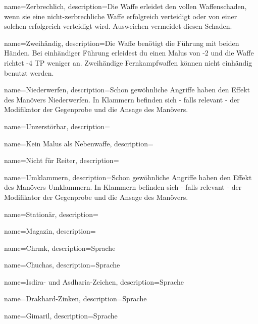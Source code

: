 {
    name={Zerbrechlich},
    description={Die Waffe erleidet den vollen Waffenschaden, wenn sie eine nicht-zerbrechliche Waffe erfolgreich verteidigt oder von einer solchen erfolgreich verteidigt wird. Ausweichen vermeidet diesen Schaden.}
}


{
    name={Zweihändig},
    description={Die Waffe benötigt die Führung mit beiden Händen. Bei einhändiger Führung erleidest du einen Malus von -2 und die Waffe richtet -4 TP weniger an. Zweihändige Fernkampfwaffen können nicht einhändig benutzt werden.}
}


{
    name={Niederwerfen},
    description={Schon gewöhnliche Angriffe haben den Effekt des Manövers Niederwerfen. In Klammern befinden sich - falls relevant - der Modifikator der Gegenprobe und die Ansage des Manövers.}
}


{
    name={Unzerstörbar},
    description={}
}


{
    name={Kein Malus als Nebenwaffe},
    description={}
}


{
    name={Nicht für Reiter},
    description={}
}


{
    name={Umklammern},
    description={Schon gewöhnliche Angriffe haben den Effekt des Manövers Umklammern. In Klammern befinden sich - falls relevant - der Modifikator der Gegenprobe und die Ansage des Manövers.}
}


{
    name={Stationär},
    description={}
}


{
    name={Magazin},
    description={}
}


{
    name={Chrmk},
    description={Sprache}
}


{
    name={Chuchas},
    description={Sprache}
}


{
    name={Isdira- und Asdharia-Zeichen},
    description={Sprache}
}


{
    name={Drakhard-Zinken},
    description={Sprache}
}


{
    name={Gimaril},
    description={Sprache}
}


